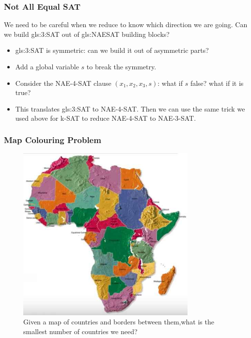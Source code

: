 \documentclass[]{article}
\begin{document}
\subsubsection{Not All Equal SAT}

We need to be careful when we reduce to know which direction we are going.
Can we build \gls{gls:3:SAT} out of \gls{gls:NAESAT} building blocks?
\begin{itemize}
	\item \gls{gls:3:SAT} is symmetric: can we build it out of asymmetric parts?
	\item Add a global variable $s$ to break the symmetry.
	\item Consider the NAE-4-SAT clause $(x_1,x_2,x_3,s)$: what if $s$ false? what if it is true?
	\item This translates  \gls{gls:3:SAT} to NAE-4-SAT. Then we can use the same trick we used above for k-SAT to reduce  NAE-4-SAT to NAE-3-SAT.
\end{itemize}

\subsubsection{Map Colouring Problem}
\begin{figure}[H]
	\begin{center}
		\caption[Map Colouring Problem]{Given a map of countries and borders between them,what is the smallest number of countries we need?}\label{fig:MapColouring}
		\includegraphics[width=0.8\textwidth]{MapColouring}
	\end{center}
\end{figure}
\end{document}
